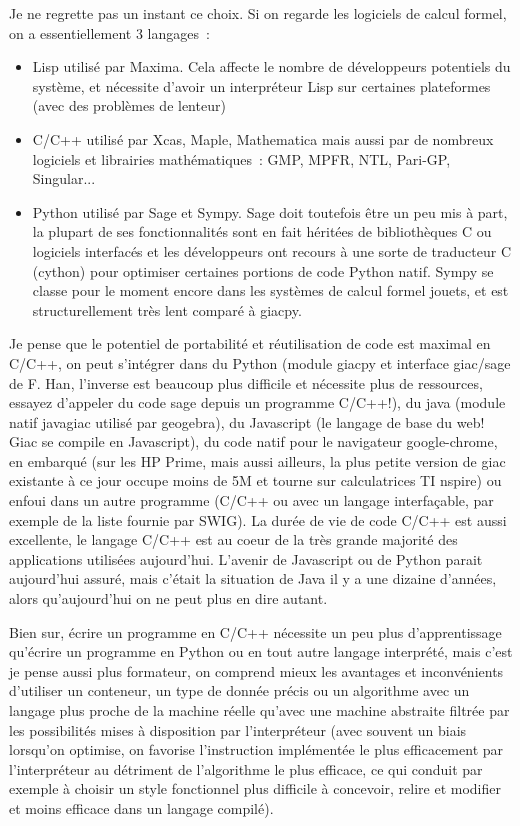 \documentclass[a4paper,11pt]{book}
\begin{document}
\begin{giacjshere}
Je ne regrette pas un instant ce choix. Si on regarde les logiciels
de calcul formel, on a essentiellement 3 langages~:
\begin{itemize}
\item Lisp utilis\'e par Maxima. Cela affecte
le nombre de d\'eveloppeurs potentiels du syst\`eme,
et n\'ecessite d'avoir un interpr\'eteur Lisp sur
certaines plateformes (avec des probl\`emes de lenteur)
\item C/C++ utilis\'e par Xcas, Maple, Mathematica
mais aussi par de nombreux logiciels et librairies
math\'ematiques~: GMP, MPFR, NTL,
Pari-GP, Singular...
\item Python utilis\'e par Sage et Sympy. Sage doit toutefois
\^etre un peu mis \`a part, la plupart de ses fonctionnalit\'es
sont en fait h\'erit\'ees de biblioth\`eques C ou logiciels
interfac\'es et les d\'eveloppeurs ont recours \`a une
sorte de traducteur C (cython) pour optimiser certaines portions de code
Python natif. Sympy se classe pour le moment encore dans les
syst\`emes de calcul formel jouets,
et est structurellement tr\`es lent compar\'e \`a giacpy.
\end{itemize}
Je pense que le potentiel de portabilit\'e
et r\'eutilisation de code est maximal en C/C++,
on peut s'int\'egrer dans du Python (module giacpy
et interface giac/sage de F. Han, l'inverse est beaucoup plus difficile et
n\'ecessite plus de ressources, essayez d'appeler
du code sage depuis un programme C/C++!),
du java (module natif javagiac utilis\'e par geogebra),
du Javascript (le langage de base du web! Giac se compile en
Javascript),
du code natif pour le navigateur google-chrome,
en embarqu\'e (sur les HP Prime, mais aussi ailleurs,
la plus petite version de giac existante \`a ce jour
occupe moins de 5M et tourne sur calculatrices TI nspire) ou
enfoui dans un autre programme (C/C++ ou avec
un langage interfa\c{c}able, par exemple de la liste fournie par SWIG).
La dur\'ee de vie de code C/C++ est aussi excellente, le
langage C/C++ est au coeur de la tr\`es grande majorit\'e
des applications utilis\'ees aujourd'hui. L'avenir de Javascript
ou de Python parait aujourd'hui assur\'e, mais c'\'etait
la situation de Java il y a une dizaine d'ann\'ees, alors
qu'aujourd'hui on ne peut plus en dire autant.

Bien sur, \'ecrire un programme en C/C++ n\'ecessite
un peu plus d'apprentissage qu'\'ecrire un programme
en Python ou en tout autre langage interpr\'et\'e,
mais c'est je pense aussi plus formateur, on
comprend mieux les avantages et inconv\'enients
d'utiliser un conteneur, un type de donn\'ee pr\'ecis
ou un algorithme avec un langage plus proche de la machine
r\'eelle qu'avec une machine abstraite filtr\'ee par les
possibilit\'es mises \`a disposition par l'interpr\'eteur
(avec souvent un biais lorsqu'on optimise, on favorise
l'instruction impl\'ement\'ee le plus efficacement par
l'interpr\'eteur au d\'etriment de l'algorithme le plus
efficace, ce qui conduit par exemple \`a choisir un style fonctionnel
plus difficile \`a concevoir, relire et modifier et moins
efficace dans un langage compil\'e).



\end{giacjshere}
\end{document}
